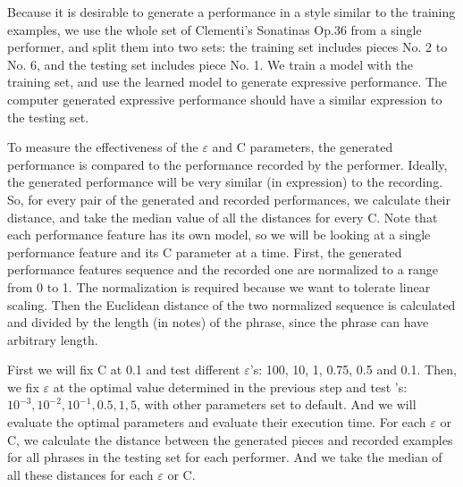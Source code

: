 Because it is desirable to generate a performance in a style similar to the training examples, we use the whole set of Clementi's Sonatinas Op.36 from a single performer, and split them into two sets: the training set includes pieces No. 2 to No. 6, and the testing set includes piece No. 1. We train a model with the training set, and use the learned model to generate expressive performance. The computer generated expressive performance should have a similar expression to the testing set. 



To measure the effectiveness of the $\varepsilon$ and C parameters, the generated performance is compared to the performance recorded by the performer. Ideally, the generated performance will be very similar (in expression) to the recording. So, for every pair of the generated and recorded performances, we calculate their distance, and take the median value of all the distances for every C. Note that each performance feature has its own model, so we will be looking at a single performance feature and its C parameter at a time.  
First, the generated performance features sequence and the recorded one are normalized to a range from 0 to 1. The normalization is required because we want to tolerate linear scaling. Then the Euclidean distance of the two normalized sequence is calculated and divided by the length (in notes) of the phrase, since the phrase can have arbitrary length.


First we will fix C at 0.1 and test different $\varepsilon$'s: 100, 10, 1, 0.75, 0.5 and 0.1. Then, we fix $\varepsilon$ at the optimal value determined in the previous step and test 's: $10^{-3}, 10^{-2}, 10^{-1}, 0.5, 1, 5$, with other parameters set to default. And we will evaluate the optimal parameters and evaluate their execution time. For each $\varepsilon$ or C, we calculate the distance between the generated pieces and recorded examples for all phrases in the testing set for each performer. And we take the median of all these distances for each $\varepsilon$ or C.


